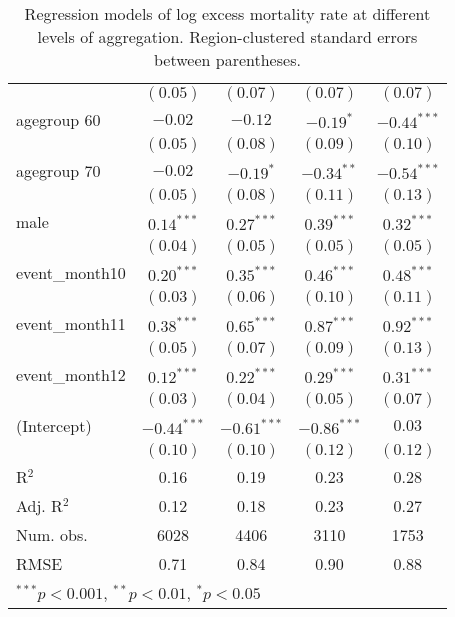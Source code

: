 \begin{table}
\begin{center}
\begin{tabular}{l c c c c }
                   & $(0.05)$      & $(0.07)$      & $(0.07)$      & $(0.07)$      \\
agegroup 60        & $-0.02$       & $-0.12$       & $-0.19^{*}$   & $-0.44^{***}$ \\
                   & $(0.05)$      & $(0.08)$      & $(0.09)$      & $(0.10)$      \\
agegroup 70        & $-0.02$       & $-0.19^{*}$   & $-0.34^{**}$  & $-0.54^{***}$ \\
                   & $(0.05)$      & $(0.08)$      & $(0.11)$      & $(0.13)$      \\
male               & $0.14^{***}$  & $0.27^{***}$  & $0.39^{***}$  & $0.32^{***}$  \\
                   & $(0.04)$      & $(0.05)$      & $(0.05)$      & $(0.05)$      \\
event\_month10     & $0.20^{***}$  & $0.35^{***}$  & $0.46^{***}$  & $0.48^{***}$  \\
                   & $(0.03)$      & $(0.06)$      & $(0.10)$      & $(0.11)$      \\
event\_month11     & $0.38^{***}$  & $0.65^{***}$  & $0.87^{***}$  & $0.92^{***}$  \\
                   & $(0.05)$      & $(0.07)$      & $(0.09)$      & $(0.13)$      \\
event\_month12     & $0.12^{***}$  & $0.22^{***}$  & $0.29^{***}$  & $0.31^{***}$  \\
                   & $(0.03)$      & $(0.04)$      & $(0.05)$      & $(0.07)$      \\
(Intercept)        & $-0.44^{***}$ & $-0.61^{***}$ & $-0.86^{***}$ & $0.03$        \\
                   & $(0.10)$      & $(0.10)$      & $(0.12)$      & $(0.12)$      \\
\hline
R$^2$              & 0.16          & 0.19          & 0.23          & 0.28          \\
Adj. R$^2$         & 0.12          & 0.18          & 0.23          & 0.27          \\
Num. obs.          & 6028          & 4406          & 3110          & 1753          \\
RMSE               & 0.71          & 0.84          & 0.90          & 0.88          \\
\hline
\multicolumn{5}{l}{\scriptsize{$^{***}p<0.001$, $^{**}p<0.01$, $^*p<0.05$}}
\end{tabular}
\caption{Regression models of log excess mortality rate at different levels of aggregation. Region-clustered standard errors between parentheses.}
\label{tab:regionmodels}
\end{center}
\end{table}
